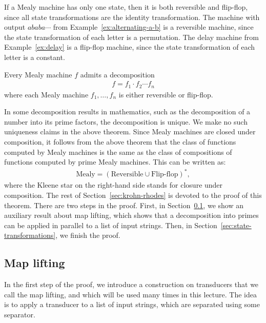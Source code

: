 \begin{myexample}
If a Mealy machine has only one state, then it is  both reversible and flip-flop, since all state transformations are the identity transformation. 
    The machine with output $ababa\cdots$ from Example~\ref{ex:alternating-a-b} is a reversible machine, since the state transformation of each letter is a permutation. 
    The delay machine from Example~\ref{ex:delay} is a flip-flop machine, since the state transformation of each letter is a constant. 
\end{myexample}


\begin{theorem} 
\label{thm:krohn-rhodes}
    Every Mealy machine $f$ admits a  decomposition
    \begin{align*}
    f = f_1 \cdot f_2  \cdots f_n
    \end{align*}
    where each  Mealy machine $f_1,\ldots,f_n$ is either reversible or flip-flop.
\end{theorem}

In some decomposition results in mathematics, such as the decomposition of a number into its prime factors, the decomposition is unique. We make no such uniqueness claims in the above theorem. 
Since Mealy machines are closed under composition, it follows from the above theorem that the class of functions computed by Mealy machines is the same as the class of compositions of  functions computed by prime Mealy machines. This can be written as: 
\begin{align*}
\text{Mealy} = (\text{Reversible} \cup \text{Flip-flop})^*,
\end{align*}
where the Kleene star on the right-hand side stands for closure under composition.
The rest of Section~\ref{sec:krohn-rhodes} is devoted to the proof of this theorem. There are two steps in the proof. First, in Section~\ref{sec:map-lifting}, we show an auxiliary result about map lifting, which shows that a decomposition into primes can be applied in parallel to a list of input strings. Then, in Section~\ref{sec:state-transformations}, we finish the proof.


\subsection{Map lifting}
\label{sec:map-lifting} In the first step of the proof, we introduce a construction on transducers that we call the map lifting, and which will be used many times in this lecture. The idea is to apply a transducer to a list of input strings, which are separated using some separator.

